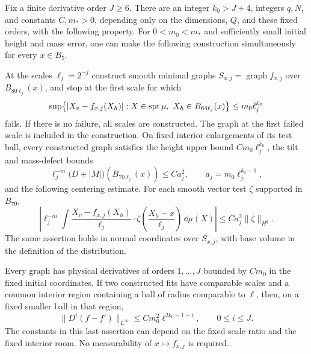 \begin{lemma}
 \label{ce:fit}
Fix a finite derivative order $J\ge6$.  There are an integer
$k_0>J+4$, integers $q,N$, and constants $C,m_*>0$, depending only on the
dimensions, $Q$, and these fixed orders, with the following property.
For $0<m_0<m_*$ and sufficiently small initial height and mass error,
one can make the following construction simultaneously for every
$x\in B_5$.

At the scales $\ell_j=2^{-j}$ construct smooth minimal graphs
$S_{x,j}=\operatorname{graph}f_{x,j}$ over $B_{80\ell_j}(x)$, and stop at
the first scale for which
\begin{equation}
 \label{ce:accept}
 \sup\bigl\{|X_v-f_{x,j}(X_h)|:
       X\in\operatorname{spt}\mu,\ X_h\in B_{64\ell_j}(x)\bigr\}
       \le m_0\ell_j^{k_0}
\end{equation}
fails.  If there is no failure, all scales are constructed.  The graph at
the first failed scale is included in the construction.  On fixed
interior enlargements of its test ball, every constructed graph satisfies
the height upper bound $C m_0\ell_j^{k_0}$, the tilt and mass-defect bounds
\begin{equation}
 \label{ce:fitenergy}
 \ell_j^{-m}\bigl(D+|M|\bigr)(B_{70\ell_j}(x))
       \le C a_j^2,
 \qquad a_j=m_0\ell_j^{k_0-1},
\end{equation}
and the following centering estimate.  For each smooth vector test
$\zeta$ supported in $B_{70}$,
\begin{equation}
 \label{ce:moment}
 \left|\ell_j^{-m}\int
   \frac{X_v-f_{x,j}(X_h)}{\ell_j}\cdot
   \zeta\left(\frac{X_h-x}{\ell_j}\right)\,\dd\mu(X)\right|
       \le C a_j^2\|\zeta\|_{H^q}.
\end{equation}
The same assertion holds in normal coordinates over $S_{x,j}$, with
base volume in the definition of the distribution.

Every graph has physical derivatives of orders $1,\ldots,J$ bounded by
$Cm_0$ in the fixed initial coordinates.  If two constructed fits have
comparable scales and a common interior region containing a ball of
radius comparable to $\ell$, then, on a fixed smaller ball in that
region,
\begin{equation}
 \label{ce:overlap}
 \|D^i(f-f')\|_{L^\infty}
       \le C m_0^2\ell^{2k_0-1-i},\qquad 0\le i\le J.
\end{equation}
The constants in this last assertion can depend on the fixed scale ratio
and the fixed interior room.  No measurability of $x\mapsto f_{x,j}$ is
required.
\end{lemma}

